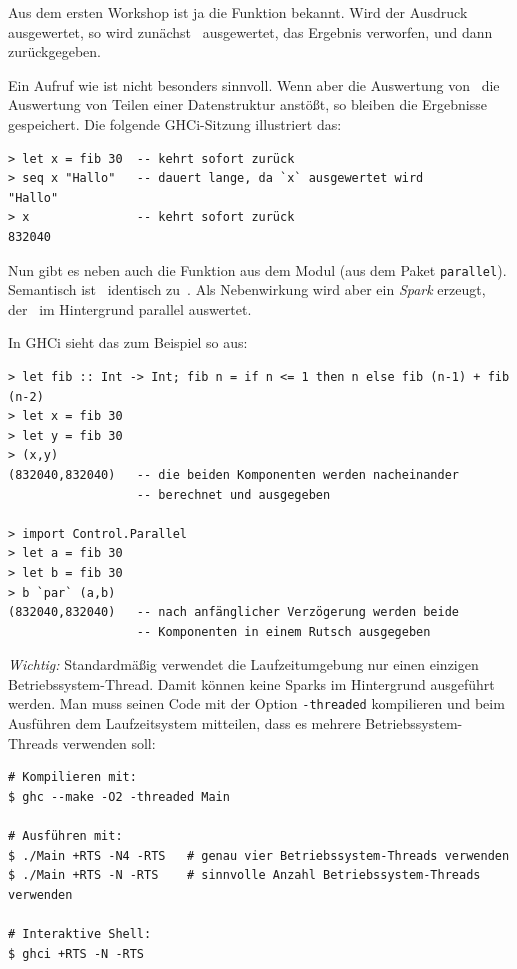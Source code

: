 \documentclass{uebblatt}
\begin{document}
Aus dem ersten Workshop ist ja die Funktion 
bekannt. Wird der Ausdruck  ausgewertet, so wird
zunächst~ ausgewertet, das Ergebnis verworfen, und
dann~ zurückgegeben.

Ein Aufruf wie  ist nicht besonders sinnvoll. Wenn aber
die Auswertung von~ die Auswertung von Teilen einer
Datenstruktur anstößt, so bleiben die Ergebnisse gespeichert. Die folgende
GHCi-Sitzung illustriert das:

\begin{verbatim}
> let x = fib 30  -- kehrt sofort zurück
> seq x "Hallo"   -- dauert lange, da `x` ausgewertet wird
"Hallo"
> x               -- kehrt sofort zurück
832040
\end{verbatim}

Nun gibt es neben  auch die Funktion  aus dem Modul  (aus dem Paket
\texttt{parallel}). Semantisch ist~ identisch
zu~. Als Nebenwirkung wird aber ein \emph{Spark} erzeugt,
der~ im Hintergrund parallel auswertet.

In GHCi sieht das zum Beispiel so aus:

\begin{verbatim}
> let fib :: Int -> Int; fib n = if n <= 1 then n else fib (n-1) + fib (n-2)
> let x = fib 30
> let y = fib 30
> (x,y)
(832040,832040)   -- die beiden Komponenten werden nacheinander
                  -- berechnet und ausgegeben

> import Control.Parallel
> let a = fib 30
> let b = fib 30
> b `par` (a,b)
(832040,832040)   -- nach anfänglicher Verzögerung werden beide
                  -- Komponenten in einem Rutsch ausgegeben
\end{verbatim}

\emph{Wichtig:} Standardmäßig verwendet die Laufzeitumgebung nur einen einzigen
Betriebssystem-Thread. Damit können keine Sparks im Hintergrund ausgeführt
werden. Man muss seinen Code mit der Option \texttt{-threaded} kompilieren und
beim Ausführen dem Laufzeitsystem mitteilen, dass es mehrere
Betriebssystem-Threads verwenden soll:

\begin{verbatim}
# Kompilieren mit:
$ ghc --make -O2 -threaded Main

# Ausführen mit:
$ ./Main +RTS -N4 -RTS   # genau vier Betriebssystem-Threads verwenden
$ ./Main +RTS -N -RTS    # sinnvolle Anzahl Betriebssystem-Threads verwenden

# Interaktive Shell:
$ ghci +RTS -N -RTS
\end{verbatim}
\end{document}
